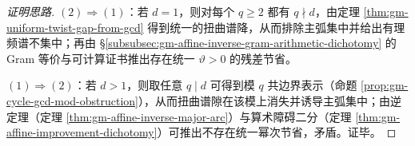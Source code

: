 \begin{proof}[证明思路]
\((2)\Rightarrow(1)\)：若 \(d=1\)，则对每个 \(q\ge 2\) 都有 \(q\nmid d\)，由定理 \ref{thm:gm-uniform-twist-gap-from-gcd} 得到统一的扭曲谱降，从而排除主弧集中并给出有理频谱不集中；再由 \S\ref{subsubsec:gm-affine-inverse-gram-arithmetic-dichotomy} 的 Gram 等价与可计算证书推出存在统一 \(\vartheta>0\) 的残差节省。
\par
\((1)\Rightarrow(2)\)：若 \(d>1\)，则取任意 \(q\mid d\) 可得到模 \(q\) 共边界表示（命题 \ref{prop:gm-cycle-gcd-mod-obstruction}），从而扭曲谱隙在该模上消失并诱导主弧集中；由逆定理（定理 \ref{thm:gm-affine-inverse-major-arc}）与算术障碍二分（定理 \ref{thm:gm-affine-improvement-dichotomy}）可推出不存在统一幂次节省，矛盾。证毕。
\end{proof}

\endinput
